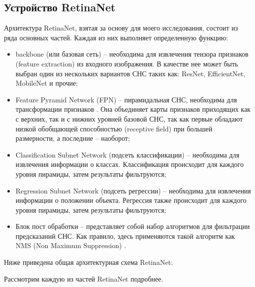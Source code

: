 \subsection{Устройство RetinaNet}\label{sect-5}

Архитектура RetinaNet, взятая за основу для моего исследования, состоит из ряда основных частей. Каждая из них выполняет определенную функцию:
\begin{itemize}
    \item backbone (или базовая сеть) -- необходима для извлечения тензора признаков (feature extraction) из входного изображения. В качестве нее может быть выбран один из нескольких вариантов СНС таких как: ResNet, EfficientNet, MobileNet и прочие;
    \item Feature Pyramid Network (FPN) -- пирамидальная СНС, необходима для трансформации признаков \cite{lib-fpn}. Она объединяет карты признаков приходящих как с верхних, так и с нижних уровней базовой СНС, так как первые обладают низкой обобщающей способностью (receptive field) при большей размерности, а последние -- наоборот;
    \item Classification Subnet Network (подсеть классификации) -- необходима для извлечения информации о классах. Классификация происходит для каждого уровня пирамиды, затем результаты фильтруются;
    \item Regression Subnet Network (подсеть регрессии) -- необходима для извлечения информации о положении объекта. Регрессия также происходит для каждого уровня пирамиды, затем результаты фильтруются;
    \item Блок пост обработки -- представляет собой набор алгоритмов для фильтрации предсказаний СНС. Как правило, здесь применяются такой алгоритм как NMS (Non Maximum Suppression) \cite{lib-nms}.
\end{itemize}

Ниже приведена общая архитектурная схема RetinaNet:


Рассмотрим каждую из частей RetinaNet подробнее.






